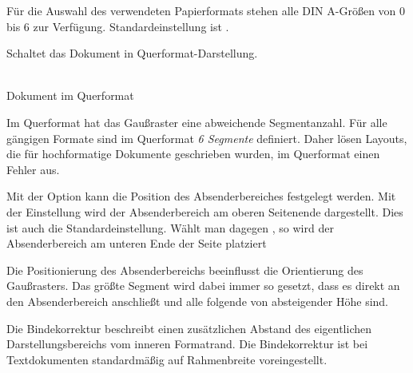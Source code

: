 \documentclass[a4paper,11pt]{tubsreprt}
\begin{document}
Für die Auswahl des verwendeten Papierformats stehen alle DIN A-Größen von
0 bis 6 zur Verfügung. Standardeinstellung ist .

\begin{Declaration}
\end{Declaration}

Schaltet das Dokument in Querformat-Darstellung.

\begin{minipage}{0.45\textwidth}\sffamily\centering
  {}\\
  Dokument im Querformat
\end{minipage}


\begin{important}
  Im Querformat hat das Gaußraster eine abweichende
  Segmentanzahl. Für alle gängigen Formate sind im Querformat \emph{6 Segmente}
  definiert. Daher lösen Layouts, die für hochformatige Dokumente
  geschrieben wurden, im Querformat einen Fehler aus.
\end{important}


\begin{Declaration}
\end{Declaration}

Mit der Option  kann die Position des Absenderbereiches
festgelegt werden. Mit der Einstellung  wird
der Absenderbereich am oberen Seitenende dargestellt. Dies ist auch die
Standardeinstellung. Wählt man dagegen , so
wird der Absenderbereich am unteren Ende der Seite platziert

\begin{important}
  Die Positionierung des Absenderbereichs beeinflusst die Orientierung des
  Gaußrasters. Das größte Segment wird dabei immer so gesetzt, dass es direkt
  an den Absenderbereich anschließt und alle folgende von absteigender Höhe sind.
\end{important}



\begin{Declaration}
\end{Declaration}

Die Bindekorrektur beschreibt einen zusätzlichen Abstand des eigentlichen
Darstellungsbereichs vom inneren Formatrand. Die Bindekorrektur
ist bei Textdokumenten standardmäßig auf Rahmenbreite voreingestellt.
\end{document}
